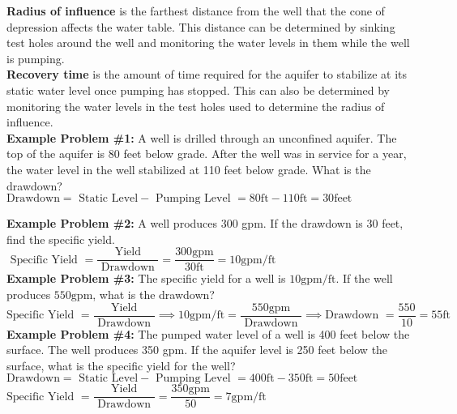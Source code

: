 \vspace{0.3cm}
\textbf{Radius of influence} is the farthest distance from the well that the cone of depression affects the water table. This distance can be determined by sinking test holes around the well and monitoring the water levels in them while the well is pumping.\\
\vspace{0.3cm}
\textbf{Recovery time} is the amount of time required for the aquifer to stabilize at its static water level once pumping has stopped. This can also be determined by monitoring the water levels in the test holes used to determine the radius of influence.\\

\textbf{Example Problem \#1:} A well is drilled through an unconfined aquifer. The top of the aquifer is 80 feet below grade. After the well was in service for a year, the water level in the well stabilized at 110 feet below grade. What is the drawdown?\\
$\text {Drawdown} =\text { Static Level}-\text { Pumping Level } =80 \mathrm{ft}-110 \mathrm{ft}=30 \mathrm{feet}$

\textbf{Example Problem \#2:} A well produces 300 gpm. If the drawdown is 30 feet, find the specific yield.\\
$\text { Specific Yield } =\dfrac{\text { Yield }}{\text { Drawdown }} =\dfrac{300 \mathrm{gpm}}{30 \mathrm{ft}} =10 \mathrm{gpm} / \mathrm{ft}$\\
  \vspace{0.3cm}
\textbf{Example Problem \#3:} The specific yield for a well is $10 \mathrm{gpm} / \mathrm{ft}$. If the well produces $550 \mathrm{gpm}$, what is the drawdown?\\
  \vspace{0.3cm}
$\text {Specific Yield }=\dfrac{\text { Yield }}{\text { Drawdown }}\implies 10 \mathrm{gpm} / \mathrm{ft}=\dfrac{550 \mathrm{gpm}}{\text { Drawdown }} \implies \text {Drawdown }= \dfrac{550}{10}=\boxed{55 \mathrm{ft}}$ \\
\textbf{Example Problem \#4:} The pumped water level of a well is 400 feet below the surface. The well produces 350 gpm. If the aquifer level is 250 feet below the surface, what is the specific yield for the well?\\
  $\text {Drawdown} =\text { Static Level}-\text { Pumping Level } =400 \mathrm{ft}-350 \mathrm{ft}=50 \mathrm{feet}$\\
  $\text {Specific Yield }=\dfrac{\text { Yield }}{\text { Drawdown }}=\dfrac{350 \mathrm{gpm}}{\text { 50 }}=7 \mathrm{gpm} / \mathrm{ft}$ \\


